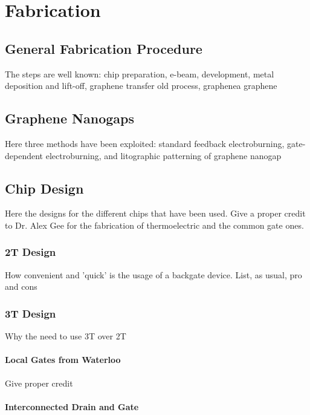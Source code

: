 \chapter{\label{ch:fabrication} Fabrication}

\minitoc

\section{General Fabrication Procedure}

The steps are well known: chip preparation, e-beam, development, metal deposition and lift-off, 
graphene transfer old process, graphenea graphene

\section{Graphene Nanogaps}

Here three methods have been exploited: standard feedback electroburning, gate-dependent electroburning, 
and litographic patterning of graphene nanogap


\section{Chip Design}

Here the designs for the different chips that have been used.
Give a proper credit to Dr. Alex Gee for the fabrication of thermoelectric and the common gate ones.

\subsection{2T Design}

How convenient and 'quick' is the usage of a backgate device.
List, as usual, pro and cons

\subsection{3T Design}

Why the need to use 3T over 2T

\subsubsection{Local Gates from Waterloo}

Give proper credit

\subsubsection{Interconnected Drain and Gate}

